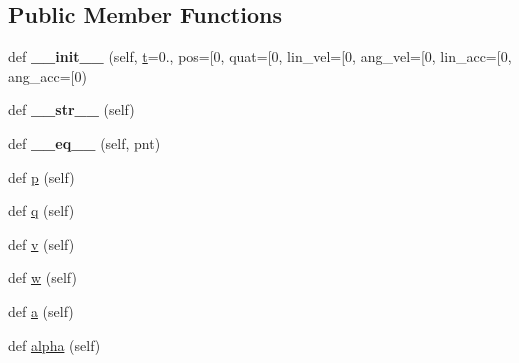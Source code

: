 \subsection*{Public Member Functions}
\begin{DoxyCompactItemize}
\item 
\mbox{\label{classuuv__trajectory__generator_1_1trajectory__point_1_1TrajectoryPoint_a4d922159665792d198c266bd2daea7ce}} 
def {\bfseries \+\_\+\+\_\+init\+\_\+\+\_\+} (self, \hyperlink{classuuv__trajectory__generator_1_1trajectory__point_1_1TrajectoryPoint_a2a5511e0e59353e487d5fcc2634e3752}{t}=0., pos=\mbox{[}0, quat=\mbox{[}0, lin\+\_\+vel=\mbox{[}0, ang\+\_\+vel=\mbox{[}0, lin\+\_\+acc=\mbox{[}0, ang\+\_\+acc=\mbox{[}0)
\item 
\mbox{\label{classuuv__trajectory__generator_1_1trajectory__point_1_1TrajectoryPoint_a850afeed55ad132080c5a9e92b5fb7c6}} 
def {\bfseries \+\_\+\+\_\+str\+\_\+\+\_\+} (self)
\item 
\mbox{\label{classuuv__trajectory__generator_1_1trajectory__point_1_1TrajectoryPoint_a8c485a36f38183e019639a1a21adf911}} 
def {\bfseries \+\_\+\+\_\+eq\+\_\+\+\_\+} (self, pnt)
\item 
def \hyperlink{classuuv__trajectory__generator_1_1trajectory__point_1_1TrajectoryPoint_a66ed66d9b06bf656b70677f3a312dc9d}{p} (self)
\item 
def \hyperlink{classuuv__trajectory__generator_1_1trajectory__point_1_1TrajectoryPoint_aa4274f2ffb28eb49b8903d1628f118b3}{q} (self)
\item 
def \hyperlink{classuuv__trajectory__generator_1_1trajectory__point_1_1TrajectoryPoint_a00fdc511268a6559422ce66efa656cc0}{v} (self)
\item 
def \hyperlink{classuuv__trajectory__generator_1_1trajectory__point_1_1TrajectoryPoint_a0be6869da30466b31aa4acdcb9bf22b6}{w} (self)
\item 
def \hyperlink{classuuv__trajectory__generator_1_1trajectory__point_1_1TrajectoryPoint_ae7c8b21e3111506543cf285b635677a3}{a} (self)
\item 
def \hyperlink{classuuv__trajectory__generator_1_1trajectory__point_1_1TrajectoryPoint_a76208f65a16b8fd8ccbcb5d51231551e}{alpha} (self)

\end{DoxyCompactItemize}
